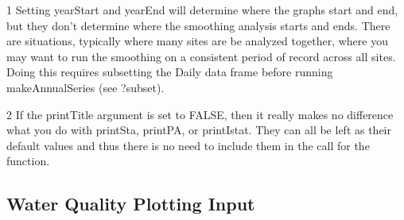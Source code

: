 \documentclass[a4paper,11pt]{article}\usepackage[]{graphicx}\usepackage[]{color}
\begin{document}
\begin{table}[ht]
\begin{threeparttable}[b]
\begin{tabularx}{\textwidth}{lXl}
\hline
\end{tabularx}
  \begin{tablenotes}
    \item[1] Setting yearStart and yearEnd will determine where the graphs start and end, but they don't determine where the smoothing analysis starts and ends.  There are situations, typically where many sites are be analyzed together, where you may want to run the smoothing on a consistent period of record across all sites.  Doing this requires subsetting the Daily data frame before running makeAnnualSeries (see ?subset).
    \item[2] If the printTitle argument is set to FALSE, then it really makes no difference what you do with printSta, printPA, or printIstat.  They can all be left as their default values and thus there is no need to include them in the call for the function.
  \end{tablenotes}
 \end{threeparttable}
\end{table}

\FloatBarrier
\clearpage

\subsection{Water Quality Plotting Input}
\label{sec:wqVariables}
\end{document}
